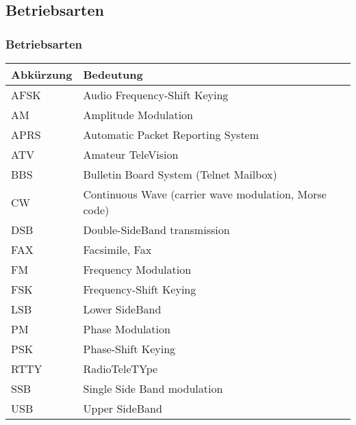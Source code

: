 \subsection*{Betriebsarten}
\begin{frame}
  \frametitle{Betriebsarten}

  \begin{center}
    \footnotesize
    \begin{tabular}{|l|l|}\hline
      \textbf{Abkürzung} & \textbf{Bedeutung}                         \\ \hline \hline
      AFSK  & Audio Frequency-Shift Keying                            \\ \hline
      AM    & Amplitude Modulation                                    \\ \hline
      APRS  & Automatic Packet Reporting System                       \\ \hline
      ATV   & Amateur TeleVision                                      \\ \hline
      BBS   & Bulletin Board System (Telnet Mailbox)                  \\ \hline
      CW    & Continuous Wave (carrier wave modulation, Morse code)   \\ \hline
      DSB   & Double-SideBand transmission                            \\ \hline
      FAX   & Facsimile, Fax                                          \\ \hline
      FM    & Frequency Modulation                                    \\ \hline
      FSK   & Frequency-Shift Keying                                  \\ \hline
      LSB   & Lower SideBand                                          \\ \hline
      PM    & Phase Modulation                                        \\ \hline
      PSK   & Phase-Shift Keying                                      \\ \hline
      RTTY  & RadioTeleTYpe                                           \\ \hline
      SSB   & Single Side Band modulation                             \\ \hline
      USB   & Upper SideBand                                          \\ \hline
    \end{tabular}
  \end{center}

\end{frame}

